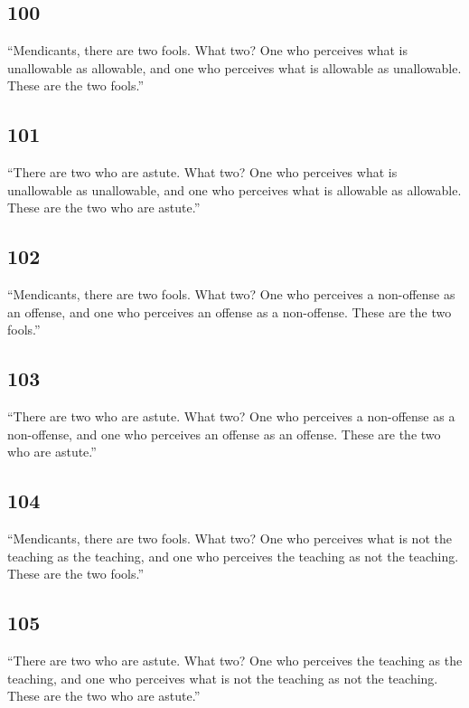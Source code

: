 \documentclass[12pt,openany]{book}%
\begin{document}
\subsection*{100 }

“Mendicants, there are two fools. What two? One who perceives what is unallowable as allowable, and one who perceives what is allowable as unallowable. These are the two fools.” 

\subsection*{101 }

“There are two who are astute. What two? One who perceives what is unallowable as unallowable, and one who perceives what is allowable as allowable. These are the two who are astute.” 

\subsection*{102 }

“Mendicants, there are two fools. What two? One who perceives a non-offense as an offense, and one who perceives an offense as a non-offense. These are the two fools.” 

\subsection*{103 }

“There are two who are astute. What two? One who perceives a non-offense as a non-offense, and one who perceives an offense as an offense. These are the two who are astute.” 

\subsection*{104 }

“Mendicants, there are two fools. What two? One who perceives what is not the teaching as the teaching, and one who perceives the teaching as not the teaching. These are the two fools.” 

\subsection*{105 }

“There are two who are astute. What two? One who perceives the teaching as the teaching, and one who perceives what is not the teaching as not the teaching. These are the two who are astute.” 
\end{document}

